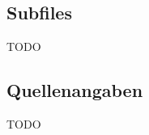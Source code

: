 \documentclass[FIPLY_base.tex]{subfiles}
\begin{document}
\subsection{Subfiles}
TODO
\subsection{Quellenangaben}
TODO
\end{document}
